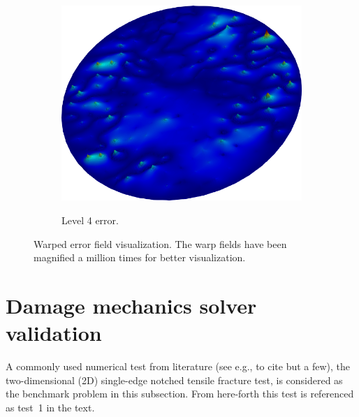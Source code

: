 \begin{figure}
\begin{subfigure}[t]{.3\linewidth}
\begin{minipage}{1\textwidth}
 	\end{minipage}\\\vspace{1.5cm}  
  \includegraphics[width=1\textwidth]{./Images/error-s8.png}
   \caption{Level 4 error.}
 \end{subfigure}
 \caption{Warped error field visualization. The warp fields have been magnified a million times for better visualization.}\label{fig:errorfiled}
 \end{figure}
 
 
\section{Damage mechanics solver validation \label{sec:Numerical-benchmarks}}
A commonly used numerical test from literature (see e.g., \cite{Ambati2014,Liu2016,jeong2018phase,Hirshikesh2018} to cite but a few), the two-dimensional (2D) single-edge notched tensile fracture test, is considered as the benchmark problem in this subsection. From here-forth this test is referenced as test~1 in the text. 


